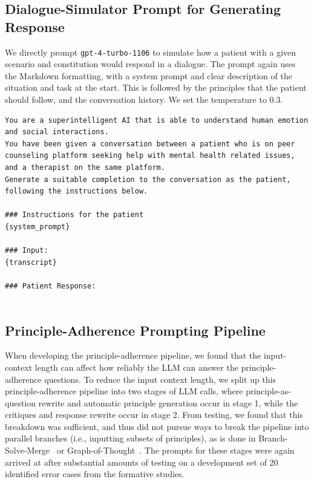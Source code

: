 \documentclass[11pt]{article}
\begin{document}
\subsection{Dialogue-Simulator Prompt for Generating Response} \label{sec:llmprompts-vanilla}
We directly prompt \lstinline{gpt-4-turbo-1106} to simulate how a patient with a given scenario and constitution would respond in a dialogue. The prompt again uses the Markdown formatting, with a system prompt and clear description of the situation and task at the start. This is followed by the principles that the patient should follow, and the conversation history. We set the temperature to 0.3. 
\begin{lstlisting}[basicstyle=\footnotesize]
You are a superintelligent AI that is able to understand human emotion and social interactions.
You have been given a conversation between a patient who is on peer counseling platform seeking help with mental health related issues, and a therapist on the same platform.
Generate a suitable completion to the conversation as the patient, following the instructions below.

### Instructions for the patient
{system_prompt}

### Input:
{transcript}

### Patient Response:
    
\end{lstlisting}

\subsection{Principle-Adherence Prompting Pipeline} \label{sec:principle-adherence-prompts}

When developing the principle-adherence pipeline, we found that the input-context length can affect how reliably the LLM can answer the principle-adherence questions. To reduce the input context length, we split up this principle-adherence pipeline into two stages of LLM calls, where principle-as-question rewrite and automatic principle generation occur in stage 1, while the critiques and response rewrite occur in stage 2.  From testing, we found that this breakdown was sufficient, and thus did not pursue ways to break the pipeline into parallel branches (i.e., inputting subsets of principles), as is done in Branch-Solve-Merge~\cite{saha2023branchsolvemerge} or Graph-of-Thought~\cite{graphofthought}. The prompts for these stages were again arrived at after substantial amounts of testing on a development set of 20 identified error cases from the formative studies.
\end{document}
